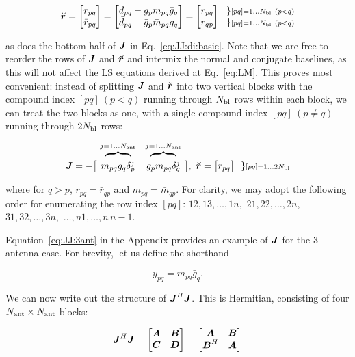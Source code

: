 \documentclass[useAMS,usenatbib]{mn2e}
\newcommand{\mat}[1]{{\bmath{#1}}}
\newcommand{\JJ}{\mat{J}} %
\begin{document}
\[
\Rr = \Matrix{c}{ r_{pq} \\ \bar{r}_{pq} } = \Matrix{c}{d_{pq}-g_p m_{pq}\bar{g}_q\\ \bar{d}_{pq}-\bar{g}_p \bar{m}_{pq}g_q} = 
\Matrix{c}{ r_{pq} \\ r_{qp} }~~ 
\Stack{ \} \scriptstyle [pq]=1\dots \Nbl~(p<q) \\ \} \scriptstyle [pq]=1\dots \Nbl~(p<q) }
\]

as does the bottom half of $\JJ$ in Eq.~\ref{eq:JJ:di:basic}. Note that we are free to reorder the rows of $\JJ$ and $\Rr$ 
and intermix the normal and conjugate baselines, as this will not affect the LS equations derived at Eq.~\ref{eq:LM}.
This proves most convenient: instead of splitting $\JJ$ and $\Rr$ into 
two vertical blocks with the compound index $[pq]~(p<q)$ running through $N_\mathrm{bl}$ rows within each block, we can treat 
the two blocks as one, with a single compound index $[pq]~(p\ne q)$ running through $2N_\mathrm{bl}$ rows:

\begin{equation}
\label{eq:JJ:di}
\begin{array}{r@{~}cc@{~}cc}
                & \overbrace{~~~~~~~~}^{j=1\dots \Na} & \overbrace{~~~~~~~~}^{j=1\dots \Na} \\
\JJ = - \big [ & m_{pq}\bar{g}_q\delta^{j}_p & g_p m_{pq} \delta^{j}_q & \big ],~
\Rr = \big [ r_{pq} \big ] ~~{\} \scriptstyle [pq]=1\dots 2\Nbl}
\end{array}
\end{equation}

where for $q>p$, $r_{pq}=\bar{r}_{qp}$ and $m_{pq}=\bar{m}_{qp}$. For clarity, we may adopt the 
following order for enumerating the row index $[pq]$: $12,13,\dots,1n,$ $21,22,\dots,2n,$ $31,32,\dots,3n,$ $\dots,n1,\dots,n\,n-1$. 

Equation~\ref{eq:JJ:3ant} in the Appendix provides an example of $\JJ$ for the 3-antenna case. For
brevity, let us define the shorthand 

\[
y_{pq} = m_{pq} \bar{g}_q. 
\]

We can now write out the 
structure of $\JJ^H\JJ$. This is Hermitian, consisting of four $N_\mathrm{ant}\times N_\mathrm{ant}$ blocks:

\begin{equation}
\label{eq:JHJ:DI:ABCD}
\JJ^H\JJ = \Matrix{cc}{\mat{A}&\mat{B}\\\mat{C}&\mat{D}} = \Matrix{cc}{\mat{A}&\mat{B}\\\mat{B}^H&\mat{A}}
\end{equation}
\end{document}
